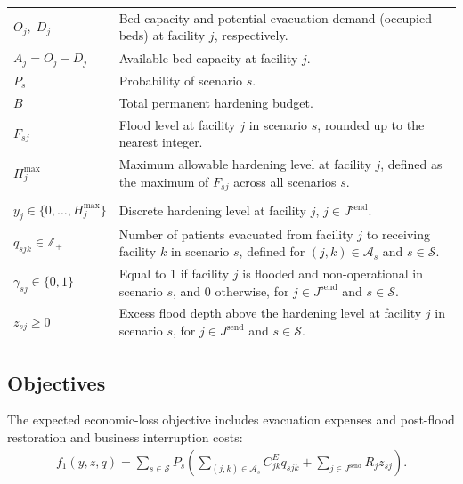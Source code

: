 \documentclass[preprint,11pt,authoryear]{elsarticle}
\begin{document}
\begin{table}[!t]
\begin{tabularx}{\textwidth}{
    @{}
    >{\raggedright\arraybackslash}p{}
    >{\raggedright\arraybackslash}X
    @{}
}
$O_j,\;D_j$
& Bed capacity and potential evacuation demand (occupied beds) at facility
$j$, respectively. \\

$A_j=O_j-D_j$
& Available bed capacity at facility $j$. \\

$P_s$
& Probability of scenario $s$. \\

$B$
& Total permanent hardening budget. \\

$F_{sj}$
& Flood level at facility $j$ in scenario $s$, rounded up to the nearest
integer. \\

$H_j^{\max}$
& Maximum allowable hardening level at facility $j$, defined as the maximum
of $F_{sj}$ across all scenarios $s$. \\
\midrule
\addlinespace[4pt]
\multicolumn{2}{@{}l}{\textit{Decision variables}} \\
\addlinespace[2pt]

$y_j\in\{0,\ldots,H_j^{\max}\}$
& Discrete hardening level at facility $j$,
$j\in J^{\text{send}}$. \\

$q_{sjk}\in\mathbb{Z}_{+}$
& Number of patients evacuated from facility $j$ to receiving facility $k$
in scenario $s$, defined for $(j,k)\in\mathcal{A}_s$ and
$s\in\mathcal{S}$. \\

$\gamma_{sj}\in\{0,1\}$
& Equal to 1 if facility $j$ is flooded and non-operational in scenario $s$,
and 0 otherwise, for $j\in J^{\text{send}}$ and $s\in\mathcal{S}$. \\

$z_{sj}\geq 0$
& Excess flood depth above the hardening level at facility $j$ in scenario
$s$, for $j\in J^{\text{send}}$ and $s\in\mathcal{S}$. \\

\bottomrule
\end{tabularx}
\end{table}

\subsection{Objectives}
The expected economic-loss objective includes evacuation expenses and post-flood restoration and business interruption costs:
\begin{align}
 f_1(y,z,q)
 = \sum_{s\in\mathcal{S}} P_s
 \left(
 \sum_{(j,k)\in\mathcal{A}_s} C_{jk}^E q_{sjk}
 + \sum_{j\in J^{\mathrm{send}}} R_j z_{sj}
 \right).
 \label{eq:f1}
\end{align}
\end{document}
